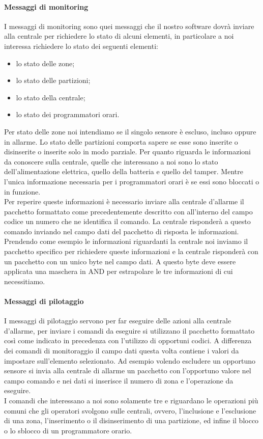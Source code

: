 \paragraph{Messaggi di monitoring}
I messaggi di monitoring sono quei messaggi che il nostro software dovrà inviare alla centrale per richiedere lo stato di alcuni elementi, in particolare a noi interessa richiedere lo stato dei seguenti elementi:
\begin{itemize}
	\item lo stato delle zone;
	\item lo stato delle partizioni;
	\item lo stato della centrale;
	\item lo stato dei programmatori orari.
\end{itemize}
Per stato delle zone noi intendiamo se il singolo sensore è escluso, incluso oppure in allarme. Lo stato delle partizioni comporta sapere se esse sono inserite o disinserite o inserite solo in modo parziale. Per quanto riguarda le informazioni da conoscere sulla centrale, quelle che interessano a noi sono lo stato dell'alimentazione elettrica, quello della batteria e quello del tamper. Mentre l'unica informazione necessaria per i programmatori orari è se essi sono bloccati o in funzione.\\
Per reperire queste informazioni è necessario inviare alla centrale d'allarme il pacchetto formattato come precedentemente descritto con all'interno del campo codice un numero che ne identifica il comando. La centrale risponderà a questo comando inviando nel campo dati del pacchetto di risposta le informazioni. Prendendo come esempio le informazioni riguardanti la centrale noi inviamo il pacchetto specifico per richiedere queste informazioni e la centrale risponderà con un pacchetto con un unico byte nel campo dati. A questo byte deve essere applicata una maschera in AND per estrapolare le tre informazioni di cui necessitiamo.
\paragraph{Messaggi di pilotaggio}
I messaggi di pilotaggio servono per far eseguire delle azioni alla centrale d'allarme, per inviare i comandi da eseguire si utilizzano il pacchetto formattato così come indicato in precedenza con l'utilizzo di  opportuni codici. A differenza dei comandi di monitoraggio il campo dati questa volta contiene i valori da impostare sull'elemento selezionato. Ad esempio volendo escludere un opportuno sensore si invia alla centrale di allarme un pacchetto con l'opportuno valore nel campo comando e nei dati si inserisce il numero di zona e l'operazione da eseguire.\\
I comandi che interessano a noi sono solamente tre e riguardano le operazioni più comuni che gli operatori svolgono sulle centrali, ovvero, l'inclusione e l'esclusione di una zona, l'inserimento o il disinserimento di una partizione, ed infine il blocco o lo sblocco di un programmatore orario.
